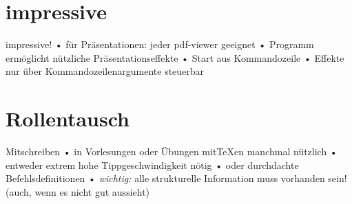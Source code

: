 
\section{impressive}
\begin{frame}{impressive!}
• für Präsentationen: jeder pdf-viewer geeignet
• Programm  ermöglicht nützliche Präsentationseffekte
• Start aus Kommandozeile
• Effekte nur über Kommandozeilenargumente steuerbar
\•
\end{frame}

\section{Rollentausch}
\begin{frame}[fragile]{Mitschreiben}
• in Vorlesungen oder Übungen mit\TeX{}en manchmal nützlich
• entweder extrem hohe Tippgeschwindigkeit nötig
• oder durchdachte Befehlsdefinitionen
• \emph{wichtig:} alle strukturelle Information muss vorhanden sein!\\%
(auch, wenn es nicht gut aussieht)
\• 
\end{frame}


